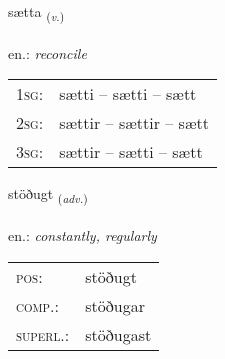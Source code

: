 \documentclass[frontgrid, backgrid]{flacards}\usepackage[]{graphicx}\usepackage[]{xcolor}
\begin{document}
\renewcommand{\flhead}{\vskip5pt \fboxsep=0pt {\small\bfseries\footnotesize Sagnorð | Verb}}
\renewcommand{\fcfoot}{\vskip5pt \fboxsep=0pt \hspace{2pt}{\small\bfseries\footnotesize 2K}}

\renewcommand{\blhead}{\vskip5pt {\small\bfseries\footnotesize Sagnorð | Verb }}
\renewcommand{\bcfoot}{\vskip5pt \hspace{2pt}{\small\bfseries\footnotesize 2K}}


{sætta \small{\textsubscript{(\textit{v.})}} \\[1ex] %
\textphonetic{[saihta]} \\
en.: \emph{reconcile} \\  [2ex]
\renewcommand*{\arraystretch}{0.8}
\begin{tabular}{p{1cm}l}
\textsc{1sg}: & sætti -- sætti -- sætt \\ 
\textsc{2sg}: & sættir -- sættir -- sætt \\ 
\textsc{3sg}: & sættir -- sætti -- sætt \\ 
\end{tabular}
}

\renewcommand{\flhead}{\vskip5pt \fboxsep=0pt {\small\bfseries\footnotesize Atviksorð | Adverb}}
\renewcommand{\fcfoot}{\vskip5pt \fboxsep=0pt \hspace{2pt}{\small\bfseries\footnotesize 2K}}

\renewcommand{\blhead}{\vskip5pt {\small\bfseries\footnotesize Atviksorð | Adverb }}
\renewcommand{\bcfoot}{\vskip5pt \hspace{2pt}{\small\bfseries\footnotesize 2K}}


{stöðugt \small{\textsubscript{(\textit{adv.})}} \\[1ex] %
\textphonetic{[stœːðʏxt]} \\
en.: \emph{constantly, regularly} \\  [2ex]
\renewcommand*{\arraystretch}{0.8}
\begin{tabular}{ll}
\textsc{pos}: & stöðugt \\ 
\textsc{comp.}: & stöðugar \\ 
\textsc{superl.}: & stöðugast \\
\end{tabular}
}
\end{document}
